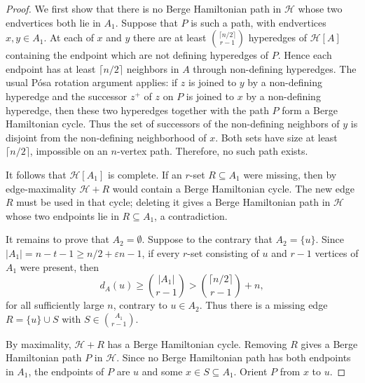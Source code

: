 \documentclass[12pt]{article}
\newcommand{\Hcal}{\mathcal H}
\begin{document}
\begin{proof}
We first show that there is no Berge Hamiltonian path in $\Hcal$ whose two
endvertices both lie in $A_1$.  Suppose that $P$ is such a path, with
endvertices $x,y\in A_1$.  At each of $x$ and $y$ there are at least
$\binom{\lceil n/2\rceil}{r-1}$ hyperedges of $\Hcal[A]$ containing the
endpoint which are not defining hyperedges of $P$.  Hence each endpoint
has at least $\lceil n/2\rceil$ neighbors in $A$ through non-defining
hyperedges.  The usual P\'osa rotation argument applies: if $z$ is joined
to $y$ by a non-defining hyperedge and the successor $z^+$ of $z$ on $P$
is joined to $x$ by a non-defining hyperedge, then these two hyperedges
together with the path $P$ form a Berge Hamiltonian cycle.  Thus the set
of successors of the non-defining neighbors of $y$ is disjoint from the
non-defining neighborhood of $x$.  Both sets have size at least
$\lceil n/2\rceil$, impossible on an $n$-vertex path.  Therefore, no such
path exists.

It follows that $\Hcal[A_1]$ is complete.  If an $r$-set
$R\subseteq A_1$ were missing, then by edge-maximality
$\Hcal+R$ would contain a Berge Hamiltonian cycle.  The new edge $R$ must
be used in that cycle; deleting it gives a Berge Hamiltonian path in
$\Hcal$ whose two endpoints lie in $R\subseteq A_1$, a contradiction.

It remains to prove that $A_2=\emptyset$.  Suppose to the contrary that
$A_2=\{u\}$.  Since
$|A_1|=n-t-1\ge n/2+\varepsilon n-1$, if every $r$-set consisting of
$u$ and $r-1$ vertices of $A_1$ were present, then
$$
        d_A(u)\ge \binom{|A_1|}{r-1}>
        \binom{\lceil n/2\rceil}{r-1}+n,
$$
for all sufficiently large $n$, contrary to $u\in A_2$.  Thus there is a
missing edge $R=\{u\}\cup S$ with $S\in\binom{A_1}{r-1}$.

By maximality, $\Hcal+R$ has a Berge Hamiltonian cycle.  Removing $R$
gives a Berge Hamiltonian path $P$ in $\Hcal$.  Since no Berge Hamiltonian
path has both endpoints in $A_1$, the endpoints of $P$ are $u$ and some
$x\in S\subseteq A_1$.  Orient $P$ from $x$ to $u$.


\end{proof}
\end{document}
